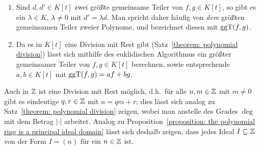 \begin{remark}
  \begin{enumerate}
    \item
      Sind $d, d' \in K[t]$ zwei größte gemeinsame Teiler von $f, g \in K[t]$, so gibt es ein $\lambda \in K$, $\lambda \neq 0$ mit $d' = \lambda d$.
      Man spricht daher häufig von \emph{dem} größten gemeinsamen Teiler zweier Polynome, und bezeichnet diesen mit $\operatorname{ggT}(f,g)$.
    \item
      Da es in $K[t]$ eine Division mit Rest gibt (Satz~\ref{theorem: polynomial division}) lässt sich mithilfe des euklidischen Algorithmus ein größter gemeinsamer Teiler von $f, g \in K[t]$ berechnen, sowie entsprechende $a, b \in K[t]$ mit $\operatorname{ggT}(f,g) = af + bg$.
  \end{enumerate}
\end{remark}

\begin{remark}
  Auch in $\mathbb{Z}$ ist eine Division mit Rest möglich, d.h.\ für alle $n, m \in \mathbb{Z}$ mit $m \neq 0$ gibt es eindeutige $q, r \in \mathbb{Z}$ mit $n = qm + r$;
  dies lässt sich analog zu Satz~\ref{theorem: polynomial division} zeigen, wobei man anstelle des Grades $\deg$ mit dem Betrag $|\cdot|$ arbeitet.
  Analog zu Proposition~\ref{proposition: the polynomial ring is a principal ideal domain} lässt sich deshalb zeigen, dass jedes Ideal $I \subseteq \mathbb{Z}$ von der Form $I = (n)$ für ein $n \in \mathbb{Z}$ ist.
\end{remark}
